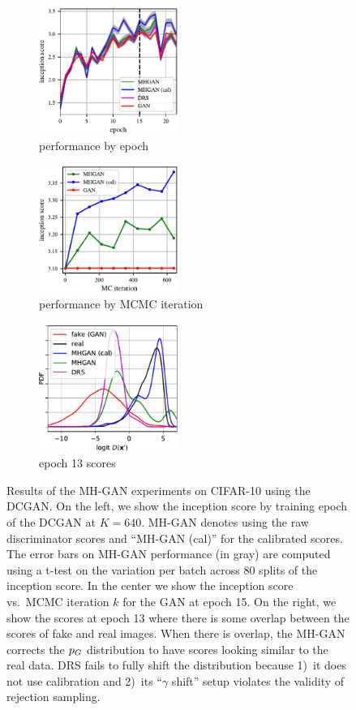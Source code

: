 \begin{figure}[htbp]
    \centering
    \begin{subfigure}[b]{0.32\textwidth}
       \centering
       \includegraphics[width=1.8in]{figures/per_epoch.pdf}
       \caption{performance by epoch}
       \label{fig:incep_by_epoch}
    \end{subfigure}
    \begin{subfigure}[b]{0.32\textwidth}
       \centering
       \includegraphics[width=1.8in]{figures/plot_per_mh.pdf}
       \caption{performance by MCMC iteration}
       \label{fig:incep_by_iter}
    \end{subfigure}
    \begin{subfigure}[b]{0.32\textwidth}
       \centering
       \includegraphics[width=1.8in]{figures/score_dist_overlap.pdf}
       \caption{epoch 13 scores}
       \label{fig:score_dist_overlap}
    \end{subfigure}
    \caption{{\small
    Results of the MH-GAN experiments on CIFAR-10 using the DCGAN\@.
    On the left, we show the inception score by training epoch of the DCGAN at $K=640$.
    MH-GAN denotes using the raw discriminator scores and ``MH-GAN (cal)'' for the calibrated scores.
    The error bars on MH-GAN performance (in gray) are computed using a t-test on the variation per batch across 80 splits of the inception score.
    In the center we show the inception score vs.~MCMC iteration $k$ for the GAN at epoch 15.
    On the right, we show the scores at epoch 13 where there is some overlap between the scores of fake and real images.
    When there is overlap, the MH-GAN corrects the ${p_G}$ distribution to have scores looking similar to the real data.
    DRS fails to fully shift the distribution because 1)~it does not use calibration and 2)~its ``$\gamma$ shift'' setup violates the validity of rejection sampling.
    }}
    \label{fig:inception}
\end{figure}


